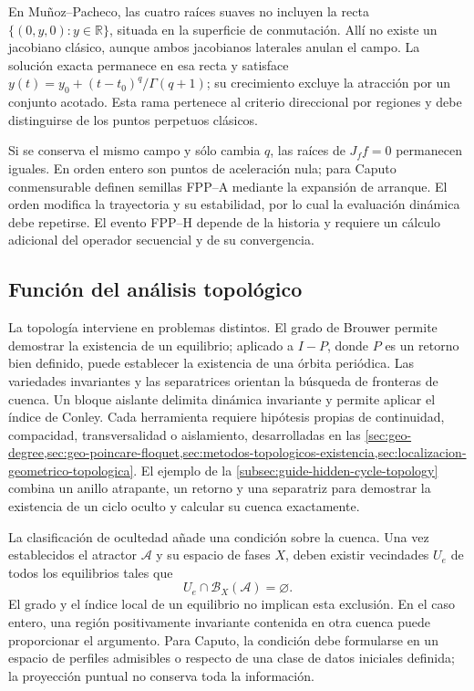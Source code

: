 En Muñoz--Pacheco, las cuatro raíces suaves no incluyen la recta
\(\{(0,y,0):y\in\mathbb R\}\), situada en la superficie de conmutación.
Allí no existe un jacobiano clásico, aunque ambos jacobianos laterales
anulan el campo. La solución exacta permanece en esa recta y satisface
\(y(t)=y_0+(t-t_0)^q/\Gamma(q+1)\); su crecimiento excluye la atracción
por un conjunto acotado. Esta rama pertenece al criterio direccional por
regiones y debe distinguirse de los puntos perpetuos clásicos.

Si se conserva el mismo campo y sólo cambia \(q\), las raíces de
\(J_ff=0\) permanecen iguales. En orden entero son puntos de aceleración
nula; para Caputo conmensurable definen semillas FPP--A mediante la expansión
de arranque. El orden modifica la trayectoria y su estabilidad, por lo cual
la evaluación dinámica debe repetirse. El evento FPP--H depende de la
historia y requiere un cálculo adicional del operador secuencial y de su
convergencia.

\subsection{Función del análisis topológico}

La topología interviene en problemas distintos. El grado de Brouwer permite
demostrar la existencia de un equilibrio; aplicado a \(I-P\), donde \(P\)
es un retorno bien definido, puede establecer la existencia de una órbita
periódica. Las variedades invariantes y las separatrices orientan la búsqueda
de fronteras de cuenca. Un bloque aislante delimita dinámica invariante y
permite aplicar el índice de Conley. Cada herramienta requiere hipótesis
propias de continuidad, compacidad, transversalidad o aislamiento, desarrolladas
en las \cref{sec:geo-degree,sec:geo-poincare-floquet,sec:metodos-topologicos-existencia,sec:localizacion-geometrico-topologica}.
El ejemplo de la \cref{subsec:guide-hidden-cycle-topology} combina un anillo
atrapante, un retorno y una separatriz para demostrar la existencia de un
ciclo oculto y calcular su cuenca exactamente.

La clasificación de ocultedad añade una condición sobre la cuenca. Una vez
establecidos el atractor \(\mathcal A\) y su espacio de fases \(X\), deben
existir vecindades \(U_e\) de todos los equilibrios tales que
\[
 U_e\cap\mathcal B_X(\mathcal A)=\varnothing.
\]
El grado y el índice local de un equilibrio no implican esta exclusión. En
el caso entero, una región positivamente invariante contenida en otra cuenca
puede proporcionar el argumento. Para Caputo, la condición debe formularse
en un espacio de perfiles admisibles o respecto de una clase de datos
iniciales definida; la proyección puntual no conserva toda la información.

